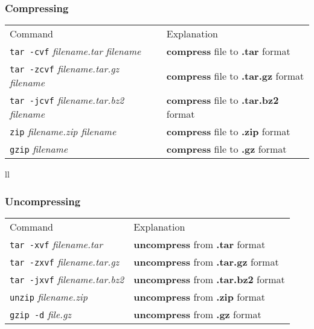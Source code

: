 \subsubsection{Compressing}
\begin{tabular}{ll}
  Command & Explanation \\
  \hhline{==}
  \texttt{tar -cvf} \textit{filename.tar} \textit{filename} & \textbf{compress} file to \textbf{.tar} format \\
  \texttt{tar -zcvf} \textit{filename.tar.gz} \textit{filename} & \textbf{compress} file to \textbf{.tar.gz} format \\
  \texttt{tar -jcvf} \textit{filename.tar.bz2} \textit{filename} & \textbf{compress} file to \textbf{.tar.bz2} format \\
  \texttt{zip} \textit{filename.zip filename} & \textbf{compress} file to \textbf{.zip} format \\
  \texttt{gzip} \textit{filename} & \textbf{compress} file to \textbf{.gz} format \\
\end{tabular}{ll}

\subsubsection{Uncompressing}
\begin{tabular}{ll}
  Command & Explanation \\
  \hhline{==}
  \texttt{tar -xvf} \textit{filename.tar} & \textbf{uncompress} from \textbf{.tar} format \\
  \texttt{tar -zxvf} \textit{filename.tar.gz} & \textbf{uncompress} from \textbf{.tar.gz} format \\
  \texttt{tar -jxvf} \textit{filename.tar.bz2} & \textbf{uncompress} from \textbf{.tar.bz2} format \\
  \texttt{unzip} \textit{filename.zip} & \textbf{uncompress} from \textbf{.zip} format \\
  \texttt{gzip -d} \textit{file.gz} & \textbf{uncompress} from \textbf{.gz} format \\
\end{tabular}

